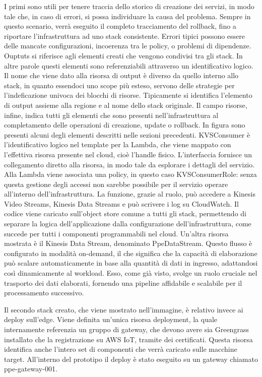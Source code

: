 I primi sono utili per tenere traccia dello storico di creazione dei servizi, in modo tale che, in caso di errori, si possa individuare la causa del problema. Sempre in questo scenario, verrà eseguito il completo tracciamento del rollback, fino a riportare l'infrastruttura ad uno stack consistente. Errori tipici possono essere delle mancate configurazioni, incoerenza tra le policy, o problemi di dipendenze. Ouptuts si riferisce agli elementi creati che vengono condivisi tra gli stack. In altre parole questi elementi sono referenziabili attraverso un identificativo logico. Il nome che viene dato alla risorsa di output è diverso da quello interno allo stack, in quanto essendoci uno scope più esteso, servono delle strategie per l'indeficazione univoca dei blocchi di risorse. Tipicamente si identifica l'elemento di output assieme alla regione e al nome dello stack originale. Il campo risorse, infine, indica tutti gli elementi che sono presenti nell'infrastruttura al completamento delle operazioni di creazione, update o rollback. In figura sono presenti alcuni degli elementi descritti nelle sezioni precedenti. KVSConsumer è l'identificativo logico nel template per la Lambda, che viene mappato con l'effettiva risorsa presente nel cloud, cioè l'handle fisico. L'interfaccia fornisce un collegamento diretto alla risorsa, in modo tale da esplorare i dettagli del servizio. Alla Lambda viene associata una policy, in questo caso KVSConsumerRole: senza questa gestione degli accessi non sarebbe possibile per il servizio operare all'interno dell'infrastruttura. La funzione, grazie al ruolo, può accedere a Kinesis Video Streams, Kinesis Data Streams e può scrivere i log su CloudWatch. Il codice viene caricato sull'object store comune a tutti gli stack, permettendo di separare la logica dell'applicazione dalla configurazione dell'infrastruttura, come succede per tutti i componenti programmabili nel cloud. Un'altra risorsa mostrata è il Kinesis Data Stream, denominato PpeDataStream. Questo flusso è configurato in modalità on-demand, il che significa che la capacità di elaborazione può scalare automaticamente in base alla quantità di dati in ingresso, adattandosi così dinamicamente al workload. Esso, come già visto, svolge un ruolo cruciale nel trasporto dei dati elaborati, fornendo una pipeline affidabile e scalabile per il processamento successivo. 
 
Il secondo stack creato, che viene mostrato nell'immagine, è relativo invece ai deploy sull'edge. Viene definita un'unica risorsa deployment, la quale internamente referenzia un gruppo di gateway, che devono avere sia Greengrass installato che la registrazione su AWS IoT, tramite dei certificati. Questa risorsa identifica anche l'intero set di componenti che verrà caricato sulle macchine target. All'interno del prototipo il deploy è stato eseguito su un gateway chiamato ppe-gateway-001. 

